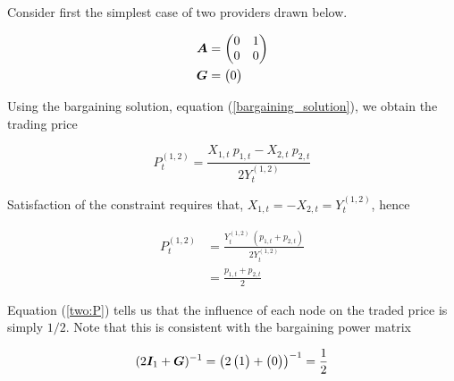 Consider first the simplest case of two providers drawn below.

\vspace{5mm}
\begin{minipage}{.5\textwidth}
  \resizebox{\textwidth}{!}{}
\end{minipage}
\begin{minipage}{.45\textwidth}
  \begin{equation*}
    \begin{split}
      \bm{A} &= \begin{pmatrix}
        0 & 1 \\
        0 & 0
      \end{pmatrix} \\
      \bm{G} &= \begin{pmatrix}
        0
      \end{pmatrix}
    \end{split}
  \end{equation*}
\end{minipage}
\vspace{5mm}

Using the bargaining solution, equation (\ref{bargaining_solution}), we obtain the trading price

\begin{equation}
  P^{(1, 2)}_t = \frac{X_{1, t} \  p_{1, t} - X_{2, t} \  p_{2, t}}{2 Y^{(1, 2)}_t}
\end{equation}

Satisfaction of the constraint requires that, $X_{1, t} = - X_{2, t} = Y^{(1, 2)}_t$, hence

\begin{equation} \label{two:P}
  \begin{split}
    P^{(1, 2)}_t &= \frac{Y^{(1, 2)}_t \  \left( p_{1, t} + p_{2, t} \right)}{2  Y^{(1, 2)}_t} \\
    &= \frac{p_{1, t} + p_{2, t}}{2}
  \end{split}
\end{equation}

Equation (\ref{two:P}) tells us that the influence of each node on the traded price is simply $1 / 2$. Note that this is consistent with the bargaining power matrix

\begin{equation}
  (2 \bm{I}_{1} + \bm{G})^{-1} = \left( 2 \begin{pmatrix} 1 \end{pmatrix} + \begin{pmatrix} 0 \end{pmatrix} \right)^{-1} = \frac{1}{2}
\end{equation}


